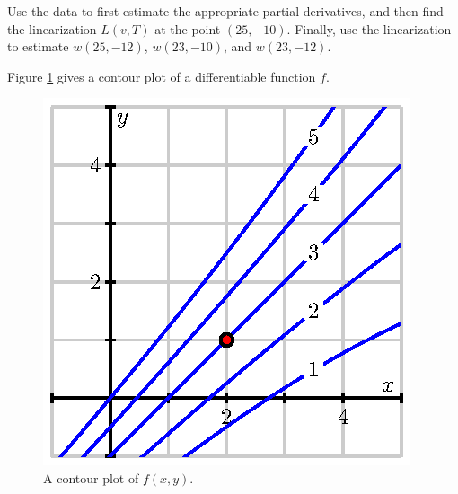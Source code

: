 \begin{activity}


Use the data to first estimate the appropriate partial derivatives, and then find the linearization $L(v,T)$ at the point $(25,-10)$.  Finally, use the linearization to estimate $w(25,-12)$, $w(23,-10)$, and $w(23,-12)$.

\item Figure \ref{F:10.4.activity.contour} gives a contour
  plot of a differentiable function $f$.  

  \begin{figure}[ht]
    \begin{center}
      \includegraphics{figures/fig_10_3_activity_contour.eps}
    \end{center}
    \caption{A contour plot of $f(x,y)$.}
    \label{F:10.4.activity.contour}
  \end{figure}


\end{activity}
